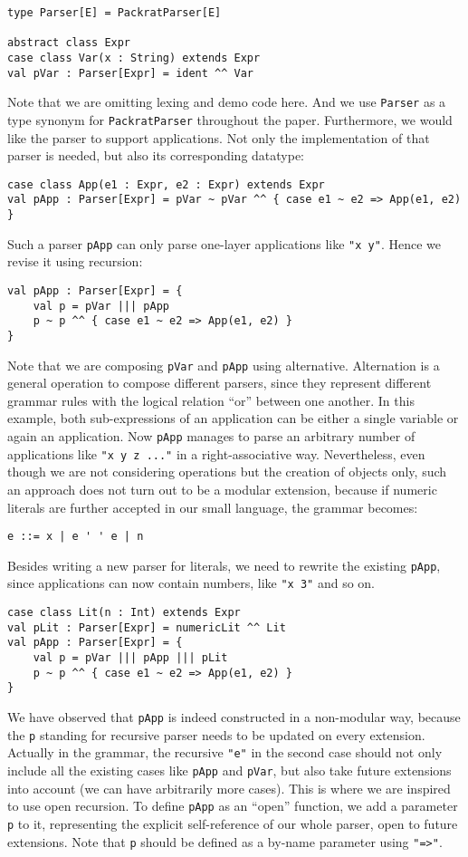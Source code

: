 \begin{lstlisting}
type Parser[E] = PackratParser[E]

abstract class Expr
case class Var(x : String) extends Expr
val pVar : Parser[Expr] = ident ^^ Var
\end{lstlisting}
Note that we are omitting lexing and demo code here. And we use \lstinline{Parser} as a type synonym for \lstinline{PackratParser} throughout the paper. Furthermore, we would like the parser to support applications.
Not only the implementation of that parser is needed, but also its corresponding datatype:
\begin{lstlisting}
case class App(e1 : Expr, e2 : Expr) extends Expr
val pApp : Parser[Expr] = pVar ~ pVar ^^ { case e1 ~ e2 => App(e1, e2) }
\end{lstlisting}
Such a parser \lstinline{pApp} can only parse one-layer applications like \lstinline{"x y"}. Hence we revise it using recursion:
\begin{lstlisting}
val pApp : Parser[Expr] = {
    val p = pVar ||| pApp
    p ~ p ^^ { case e1 ~ e2 => App(e1, e2) }
}
\end{lstlisting}
Note that we are composing \lstinline{pVar} and \lstinline{pApp} using alternative. Alternation is a general operation to compose different parsers, since they represent different grammar rules with the logical relation ``or'' between one another. In this example, both sub-expressions of an application can be either a single variable or again an application. Now \lstinline{pApp} manages to parse an arbitrary number of applications like \lstinline{"x y z ..."} in a right-associative way.
Nevertheless, even though we are not considering operations but the creation of objects only, such an approach does not turn out to be a modular extension, because if numeric literals are further accepted in our small language, the grammar becomes:
\begin{lstlisting}
e ::= x | e ' ' e | n
\end{lstlisting}
Besides writing a new parser for literals, we need to rewrite the existing \lstinline{pApp}, since applications can now contain numbers, like \lstinline{"x 3"} and so on.
\begin{lstlisting}
case class Lit(n : Int) extends Expr
val pLit : Parser[Expr] = numericLit ^^ Lit
val pApp : Parser[Expr] = {
    val p = pVar ||| pApp ||| pLit
    p ~ p ^^ { case e1 ~ e2 => App(e1, e2) }
}
\end{lstlisting}
We have observed that \lstinline{pApp} is indeed constructed in a non-modular way, because the \lstinline{p} standing for recursive parser needs to be updated on every extension. Actually in the grammar, the recursive \lstinline{"e"} in the second case should not only include all the existing cases like \lstinline{pApp} and \lstinline{pVar}, but also take future extensions into account (we can have arbitrarily more cases). This is where we are inspired to use open recursion. To define \lstinline{pApp} as an ``open'' function, we add a parameter \lstinline{p} to it, representing the explicit self-reference of our whole parser, open to future extensions. Note that \lstinline{p} should be defined as a by-name parameter using \lstinline{"=>"}.
